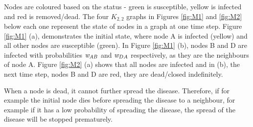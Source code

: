 \documentclass[a4paper,11pt]{article}
\begin{document}
Nodes are coloured based on the status - green is susceptible, yellow is infected and red is removed/dead. The four $K_{2,2}$ graphs in Figures \ref{fig:M1} and \ref{fig:M2} below each one represent the state of nodes in a graph at one time step. Figure \ref{fig:M1} (a), demonstrates the initial state, where node A is infected (yellow) and all other nodes are susceptible (green). In Figure \ref{fig:M1} (b), nodes B and D are infected with probabilities ${\emph{w} _{AB}}$  and ${\emph{w}_{DA}}$ respectively, as they are the neighbours of node A. Figure \ref{fig:M2} (a) shows that all nodes are infected and in (b), the next time step, nodes B and D are red, they are dead/closed indefinitely. 

When a node is dead, it cannot further spread the disease. Therefore, if for example the initial node dies before spreading the disease to a neighbour, for example if it has a low probability of spreading the disease, the spread of the disease will be stopped prematurely.
\end{document}
